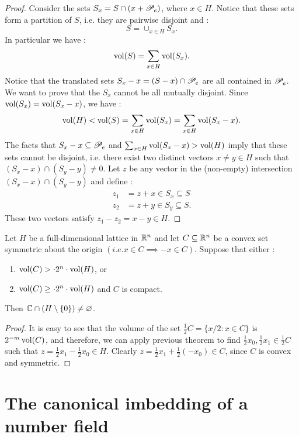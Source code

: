 \begin{proof}
  Consider the sets $S_x = S\cap (x+\mathscr{P}_e)$, where $x\in H$. Notice that these sets form a partition of $S$, i.e. they are pairwise disjoint and :
  \[S = \cup_{x\in H} S_x.\]
  In particular we have :
  \[\operatorname{vol}(S) = \sum_{x\in H}\operatorname{vol}(S_x).\]
  Notice that the translated sets $S_x - x = (S-x)\cap \mathscr{P}_e$ are all contained in $\mathscr{P}_e$. We want to prove that the $S_x$ cannot be all mutually disjoint. Since $\operatorname{vol}(S_x) = \operatorname{vol}(S_x - x)$, we have :
  \[\operatorname{vol}(H)<\operatorname{vol}(S) = \sum_{x\in H}\operatorname{vol}(S_x) = \sum_{x\in H} \operatorname{vol}(S_x - x).\]
  The facts that $S_x - x \subseteq \mathscr{P}_e$ and $\sum_{x\in H}\operatorname{vol}(S_x-x)> \operatorname{vol}(H)$ imply that these sets cannot be disjoint, i.e. there exist two distinct vectors $x\neq y \in H$ such that $(S_x - x)\cap (S_y - y)\neq 0$. Let $z$ be any vector in the (non-empty) intersection $(S_x-x)\cap (S_y - y)$ and define :
  \begin{align*}
    z_1 &= z + x \in S_x \subseteq S \\
    z_2 &= z + y \in S_y \subseteq S.
  \end{align*}
  These two vectors satisfy $z_1 - z_2 = x-y \in H$.
\end{proof}

\begin{theorem}
  Let $H$ be a full-dimensional lattice in $\mathbb{R}^n$ and let $C\subseteq \mathbb{R}^n$ be a convex set symmetric about the origin $(i.e. x\in C \implies -x\in C)$. Suppose that either :
  \begin{enumerate}
    \item $\operatorname{vol}(C) > \cdot 2^n \cdot \operatorname{vol}(H)$, or
    \item $\operatorname{vol}(C) \geq \cdot 2^n \cdot \operatorname{vol}(H)$ and $C$ is compact.
  \end{enumerate}
  Then $ \mathbb{C}\cap (H\setminus\{0\})\neq \varnothing$.
\end{theorem}
\begin{proof}
  It is easy to see that the volume of the set $\frac12 C = \{x/2 : x\in C\}$ is $2^{-m}\operatorname{vol}(C)$, and therefore, we can apply previous theorem to find $\frac12 x_0,\frac12 x_1\in \frac12 C$ such that $z = \frac12 x_1 - \frac12 x_0 \in H$. Clearly $z = \frac12 x_1 + \frac12 (-x_0) \in C$, since $C$ is convex and symmetric.
\end{proof}


\section{The canonical imbedding of a number field}


